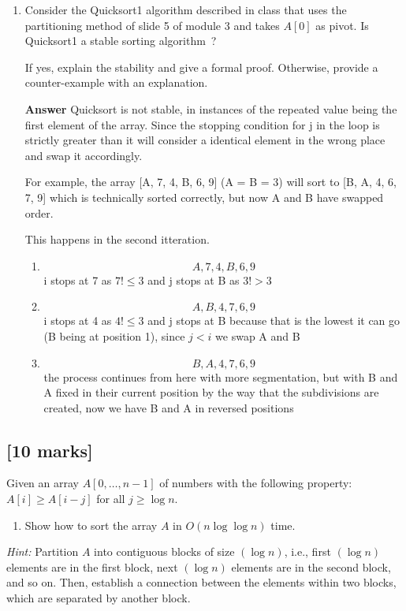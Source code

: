\documentclass[12pt]{article}
\begin{document}
\begin{enumerate}
  \item Consider the Quicksort1 algorithm described in class that uses the
  partitioning method of slide 5 of module 3 and takes $A [0]$ as pivot. Is
  Quicksort1 a stable sorting algorithm~?

  If yes, explain the stability and give a formal proof. Otherwise, provide a
  counter-example with an explanation.

  \textbf{Answer} Quicksort is not stable, in instances of the repeated value being the first element of the array. Since the stopping condition for j in the loop is strictly greater than it will consider a identical element in the wrong place and swap it accordingly.

  For example, the array [A, 7, 4, B, 6, 9] (A = B = 3) will sort to [B, A, 4, 6, 7, 9] which is technically sorted correctly, but now A and B have swapped order.

  This happens in the second itteration.
  \begin{enumerate}[1)]
    \item \[A, 7, 4, B, 6, 9\] i stops at 7 as $7 !\leq 3$ and j stops at B as $3 !> 3$
    \item \[A, B, 4, 7, 6, 9\] i stops at 4 as $4 !\leq 3$ and j stops at B because that is the lowest it can go (B being at position 1), since $j < i$ we swap A and B
    \item \[B, A, 4, 7, 6, 9\] the process continues from here with more segmentation, but with B and A fixed in their current position by the way that the subdivisions are created, now we have B and A in reversed positions
  \end{enumerate}

\end{enumerate}

\subsection{[10 marks]}

Given an array $A [0, \ldots, n - 1]$ of numbers with the following property:
$A [i] \geq A [i - j]$ for all $j \geq \log n$.
\begin{enumerate}
  \item Show how to sort the array $A$ in $O (n \log \log n)$ time.
\end{enumerate}
\emph{Hint:} Partition $A$ into contiguous blocks of size $(\log n)$,
i.e., first $(\log n)$ elements are in the first block, next $(\log n)$
elements are in the second block, and so on. Then, establish a connection
between the elements within two blocks, which are separated by another block.
\end{document}
